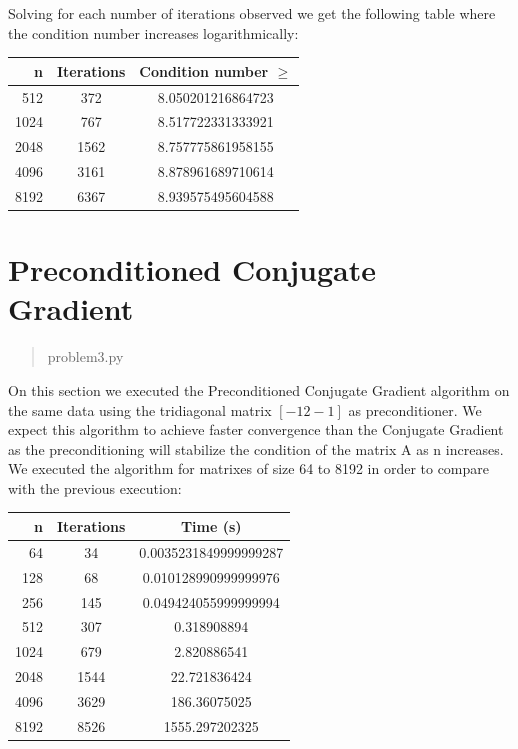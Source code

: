 \documentclass[a4paper]{article}
\begin{document}
Solving for each number of iterations observed we get the following table where the condition number increases logarithmically:
\begin{center}
	\begin{tabular}{r | c | c}
		n & Iterations & Condition number $\ge$\\ \hline
		512 & 372 & 8.050201216864723\\ \hline
		1024 & 767 & 8.517722331333921\\ \hline
		2048 & 1562 & 8.757775861958155\\ \hline
		4096 & 3161 & 8.878961689710614\\ \hline
		8192 & 6367 & 8.939575495604588\\ \hline
	\end{tabular} 
\end{center}

\section{Preconditioned Conjugate Gradient}
\begin{quote}
	problem3.py
\end{quote}
On this section we executed the Preconditioned Conjugate Gradient algorithm on the same data using the tridiagonal matrix $[-1 2 -1]$ as preconditioner. We expect this algorithm to achieve faster convergence than the Conjugate Gradient as the preconditioning will stabilize the condition of the matrix A as n increases. We executed the algorithm for matrixes of size 64 to 8192 in order to compare with the previous execution:

\begin{center}
	\begin{tabular}{r | c | c}
		n & Iterations & Time (s)\\ \hline
		64 & 34 & 0.0035231849999999287\\ \hline
		128 & 68 & 0.010128990999999976\\ \hline
		256 & 145 & 0.049424055999999994\\ \hline
		512 & 307 & 0.318908894\\ \hline
		1024 & 679 & 2.820886541\\ \hline
		2048 & 1544 & 22.721836424\\ \hline
		4096 & 3629 & 186.36075025\\ \hline
		8192 & 8526 & 1555.297202325\\ \hline
	\end{tabular} 
\end{center}
\end{document}
